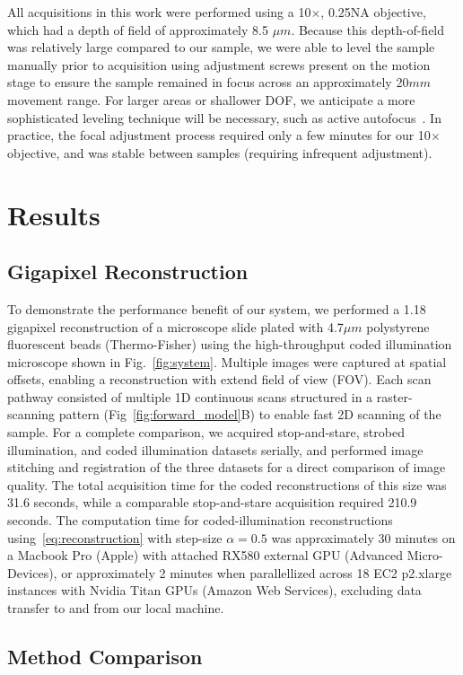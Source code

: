 All acquisitions in this work were performed using a 10$\times$, 0.25NA objective, which had a depth of field of approximately 8.5 $\mu m$. Because this depth-of-field was relatively large compared to our sample, we were able to level the sample manually prior to acquisition using adjustment screws present on the motion stage to ensure the sample remained in focus across an approximately 20$mm$ movement range. For larger areas or shallower DOF, we anticipate a more sophisticated leveling technique will be necessary, such as active autofocus~\cite{nikonperfect, zeissdefinite}. In practice, the focal adjustment process required only a few minutes for our 10$\times$ objective, and was stable between samples (requiring infrequent adjustment).

\section{Results}\label{sec:results}
\subsection{Gigapixel Reconstruction}
To demonstrate the performance benefit of our system, we performed a 1.18 gigapixel reconstruction of a microscope slide plated with 4.7$\mu m$ polystyrene fluorescent beads (Thermo-Fisher) using the high-throughput coded illumination microscope shown in Fig.~\ref{fig:system}. Multiple images were captured at spatial offsets, enabling a reconstruction with extend field of view (FOV). Each scan pathway consisted of multiple 1D continuous scans structured in a raster-scanning pattern (Fig~\ref{fig:forward_model}{B}) to enable fast 2D scanning of the sample. For a complete comparison, we acquired stop-and-stare, strobed illumination, and coded illumination datasets serially, and performed image stitching and registration of the three datasets for a direct comparison of image quality. The total acquisition time for the coded reconstructions of this size was 31.6 seconds, while a comparable stop-and-stare acquisition required 210.9 seconds. The computation time for coded-illumination reconstructions using~\eqref{eq:reconstruction} with step-size $\alpha=0.5$ was approximately 30 minutes on a Macbook Pro (Apple) with attached RX580 external GPU (Advanced Micro-Devices), or approximately 2 minutes when parallellized across 18 EC2 p2.xlarge instances with Nvidia Titan GPUs (Amazon Web Services), excluding data transfer to and from our local machine.

\subsection{Method Comparison}\label{sec:method_comparison}

